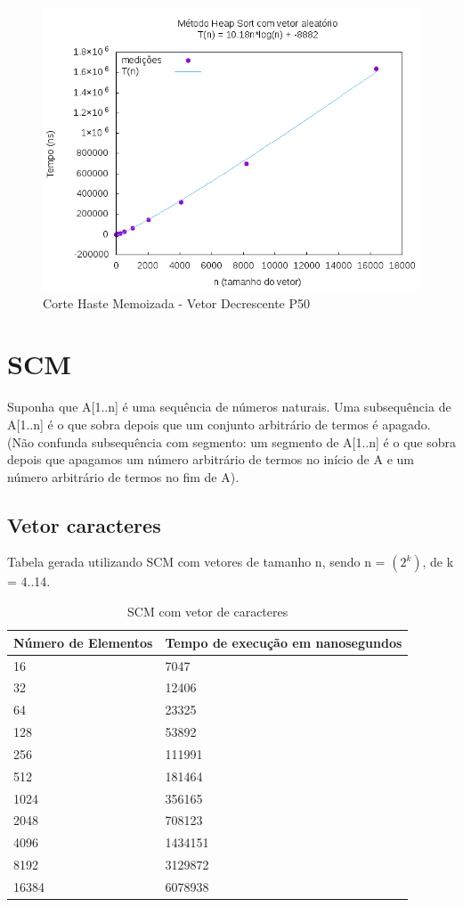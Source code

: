 \documentclass[12pt,a4paper,twoside]{report}
\begin{document}
\begin{figure}[H]
    \centering
    \includegraphics[width=0.7\linewidth]{graficos/HeapSort/vIntAleatorio/vIntAleatorio.png}
  \caption{Corte Haste Memoizada - Vetor Decrescente P50}
\end{figure}

\section{SCM}

Suponha que A[1..n] é uma sequência de números naturais. Uma subsequência de A[1..n] é o que sobra depois que um conjunto arbitrário de termos é apagado.  (Não confunda subsequência com segmento: um segmento de A[1..n] é o que sobra depois que apagamos um número arbitrário de termos no início de A e um número arbitrário de termos no fim de A).

\subsection{Vetor caracteres}
Tabela gerada utilizando SCM com vetores de tamanho n, sendo n = $(2^k)$, de k = 4..14.
\begin{table}[H]
\centering
\caption{SCM com vetor de caracteres}
\label{my-label}
\begin{tabular}{|l|l|}
\hline
\multicolumn{1}{|c|}{\textbf{Número de Elementos}} & \multicolumn{1}{c|}{\textbf{Tempo de execução em nanosegundos}} \\ \hline
16 & 7047 \\ \hline
32 & 12406 \\ \hline
64 & 23325 \\ \hline
128 & 53892 \\ \hline
256 & 111991 \\ \hline
512 & 181464 \\ \hline
1024 & 356165 \\ \hline
2048 & 708123 \\ \hline
4096 & 1434151 \\ \hline
8192 & 3129872 \\ \hline
16384 & 6078938 \\ \hline

\end{tabular}
\end{table}
\end{document}
